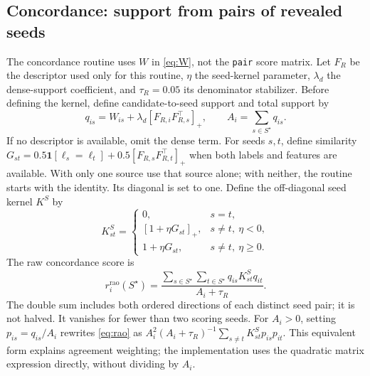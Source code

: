 \documentclass[11pt,a4paper]{article}
\newcommand{\code}[1]{\nolinkurl{#1}}
\newcommand{\sig}[1]{\mathrm{#1}}
\numberwithin{equation}{section}
\begin{document}
\subsection{Concordance: support from pairs of revealed seeds}\label{sec:rao}
The concordance routine uses $W$ in \eqref{eq:W}, not the \code{pair} score matrix.
Let $F_R$ be the descriptor used only for this routine, $\eta$ the seed-kernel parameter,
$\lambda_d$ the dense-support coefficient, and $\tau_R=0.05$ its denominator stabilizer.
Before defining the kernel, define candidate-to-seed support and total support by
\begin{equation}
 q_{is}=W_{is}+\lambda_d[F_{R,i}F_{R,s}^\top]_+,
 \qquad A_i=\sum_{s\in S^\star}q_{is}.
\end{equation}
If no descriptor is available, omit the dense term. For seeds $s,t$, define similarity
$G_{st}=0.5\mathbf1[\ell_s=\ell_t]+0.5[F_{R,s}F_{R,t}^\top]_+$ when both labels and
features are available. With only one source use that source alone; with neither, the
routine starts with the identity. Its diagonal is set to one. Define the off-diagonal
seed kernel $K^S$ by
\begin{equation}
 K^S_{st}=\begin{cases}
 0,&s=t,\\
 [1+\eta G_{st}]_+,&s\ne t,\ \eta<0,\\
 1+\eta G_{st},&s\ne t,\ \eta\ge0.
 \end{cases}
\end{equation}
The raw concordance score is
\begin{equation}\label{eq:rao}
 r^{\sig{rao}}_i(S^\star)=
 \frac{\displaystyle\sum_{s\in S^\star}\sum_{t\in S^\star}
                 q_{is}K^S_{st}q_{it}}
      {A_i+\tau_R}.
\end{equation}
The double sum includes both ordered directions of each distinct seed pair; it is not
halved. It vanishes for fewer than two scoring seeds. For $A_i>0$, setting
$p_{is}=q_{is}/A_i$ rewrites \eqref{eq:rao} as
$A_i^2(A_i+\tau_R)^{-1}\sum_{s\ne t}K^S_{st}p_{is}p_{it}$.
This equivalent form explains agreement weighting; the implementation uses the quadratic
matrix expression directly, without dividing by $A_i$.
\end{document}
